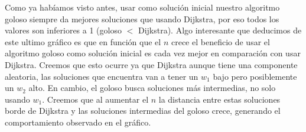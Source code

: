 Como ya habíamos visto antes, usar como solución inicial nuestro algoritmo goloso siempre da mejores soluciones que usando Dijkstra, por eso todos los valores son inferiores a 1 (goloso $<$ Dijkstra). Algo interesante que deducimos de este ultimo gráfico es que en función que el $n$ crece el beneficio de usar el algoritmo goloso como solución inicial es cada vez mejor en comparación con usar Dijkstra. Creemos que esto ocurre ya que Dijkstra aunque tiene una componente aleatoria, las soluciones que encuentra van a tener un $w_1$ bajo pero posiblemente un $w_2$ alto. En cambio, el goloso busca soluciones más intermedias, no solo usando $w_1$. Creemos que al aumentar el $n$ la distancia entre estas soluciones borde de Dijkstra y las soluciones intermedias del goloso crece, generando el comportamiento observado en el gráfico. 